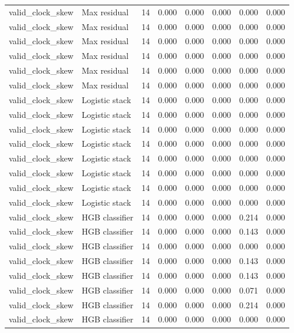 {\begin{longtable}{llrrrrrr}
valid\_clock\_skew & Max residual & 14 & 0.000 & 0.000 & 0.000 & 0.000 & 0.000 \\
valid\_clock\_skew & Max residual & 14 & 0.000 & 0.000 & 0.000 & 0.000 & 0.000 \\
valid\_clock\_skew & Max residual & 14 & 0.000 & 0.000 & 0.000 & 0.000 & 0.000 \\
valid\_clock\_skew & Max residual & 14 & 0.000 & 0.000 & 0.000 & 0.000 & 0.000 \\
valid\_clock\_skew & Max residual & 14 & 0.000 & 0.000 & 0.000 & 0.000 & 0.000 \\
valid\_clock\_skew & Max residual & 14 & 0.000 & 0.000 & 0.000 & 0.000 & 0.000 \\
valid\_clock\_skew & Logistic stack & 14 & 0.000 & 0.000 & 0.000 & 0.000 & 0.000 \\
valid\_clock\_skew & Logistic stack & 14 & 0.000 & 0.000 & 0.000 & 0.000 & 0.000 \\
valid\_clock\_skew & Logistic stack & 14 & 0.000 & 0.000 & 0.000 & 0.000 & 0.000 \\
valid\_clock\_skew & Logistic stack & 14 & 0.000 & 0.000 & 0.000 & 0.000 & 0.000 \\
valid\_clock\_skew & Logistic stack & 14 & 0.000 & 0.000 & 0.000 & 0.000 & 0.000 \\
valid\_clock\_skew & Logistic stack & 14 & 0.000 & 0.000 & 0.000 & 0.000 & 0.000 \\
valid\_clock\_skew & Logistic stack & 14 & 0.000 & 0.000 & 0.000 & 0.000 & 0.000 \\
valid\_clock\_skew & Logistic stack & 14 & 0.000 & 0.000 & 0.000 & 0.000 & 0.000 \\
valid\_clock\_skew & HGB classifier & 14 & 0.000 & 0.000 & 0.000 & 0.214 & 0.000 \\
valid\_clock\_skew & HGB classifier & 14 & 0.000 & 0.000 & 0.000 & 0.143 & 0.000 \\
valid\_clock\_skew & HGB classifier & 14 & 0.000 & 0.000 & 0.000 & 0.000 & 0.000 \\
valid\_clock\_skew & HGB classifier & 14 & 0.000 & 0.000 & 0.000 & 0.143 & 0.000 \\
valid\_clock\_skew & HGB classifier & 14 & 0.000 & 0.000 & 0.000 & 0.143 & 0.000 \\
valid\_clock\_skew & HGB classifier & 14 & 0.000 & 0.000 & 0.000 & 0.071 & 0.000 \\
valid\_clock\_skew & HGB classifier & 14 & 0.000 & 0.000 & 0.000 & 0.214 & 0.000 \\
valid\_clock\_skew & HGB classifier & 14 & 0.000 & 0.000 & 0.000 & 0.000 & 0.000 \\

\end{longtable}}
